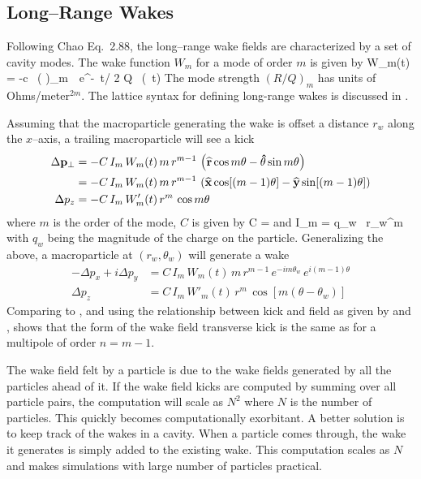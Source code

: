 \subsection{Long--Range Wakes}
\label{s:wake.long}

Following Chao\cite{b:chao} Eq.~2.88, the long--range wake fields are
characterized by a set of cavity modes. The wake function $W_m$ for a
mode of order $m$ is given by
\Begineq
  W_m(t) = -c \, \left(  \right)_m \,\,
  e^{-\omega \, t/ 2 Q} \, \sin (\omega \, t)
  \label{wcrq}
\Endeq
The mode strength $(R/Q)_m$ has units of Ohms/meter$^{2m}$.
The lattice syntax for defining long-range wakes is discussed in .

Assuming that the macroparticle generating the wake is offset a
distance $r_w$ along the $x$--axis, a trailing macroparticle will see a kick
\begin{align}
  \Delta {{\bf p}}_\perp &= 
    -C \, I_m \, W_m(t) \, m \, r^{m-1} \, \left( 
    {\widehat{\bf r}} \cos m\theta - {\bf\hat\theta} \sin m\theta \right) \\
  &= -C \, I_m \, W_m(t) \, m \, r^{m-1} \, \left( 
    {\widehat{\bf x}} \cos [(m-1) \theta] - 
    {\widehat{\bf y}} \sin [(m-1)\theta] \right) \nonumber \\
  \Delta p_z &= -C \, I_m \, W'_m(t) \, r^m \, \cos m\theta
\end{align}
where $m$ is the order of the mode, $C$ is given by
\Begineq
  C = 
\Endeq
 and
\Begineq
  I_m = q_w \, r_w^m
\Endeq
with $q_w$ being the magnitude of the charge on the particle. 
Generalizing the above, a macroparticle at $(r_w, \theta_w)$ will generate a wake
\begin{align}
  -\Delta p_x + i\Delta p_y &= C \, I_m \, W_m(t) \, 
    m \, r^{m-1} \, e^{-i m \theta_w} \, e^{i (m-1) \theta} 
    \label{ppcimr} \\
  \Delta p_z &= C \, I_m \, W'_m(t) \, r^m \, \cos [m(\theta - \theta_w)]
    \label{pciwr}
\end{align}
Comparing  to , and using the relationship between
kick and field as given by  and , shows that
the form of the wake field transverse kick is the same as for a
multipole of order $n = m - 1$. 

The wake field felt by a particle is due to the wake fields generated by
all the particles ahead of it. If the wake field kicks are computed by
summing over all particle pairs, the
computation will scale as $N^2$ where $N$ is the number of
particles. This quickly becomes computationally exorbitant. A better
solution is to keep track of the wakes in a cavity. When a particle
comes through, the wake it generates is simply added to the existing
wake. This computation scales as $N$ and makes simulations with large
number of particles practical. 

